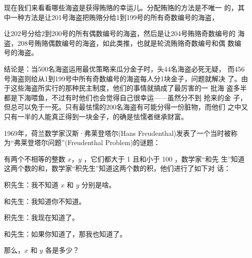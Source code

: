 现在我们来看看哪些海盗是获得贿赂的幸运儿。分配贿赂的方法是不唯一 的，其
中一种方法是让201号海盗把贿赂分给1到199号的所有奇数编号的海盗，
  
让202号分给2到200号的所有偶数编号的海盗，然后是让204号贿赂奇数编号的 海
盗，208号贿赂偶数编号的海盗，如此类推，也就是轮流贿赂奇数编号和偶 数编
号的海盗。
    
结论是：当500名海盗运用最优策略来瓜分金子时，头44名海盗必死无疑，
而456号海盗则给从1到199号中所有奇数编号的海盗每人分1块金子，问题就解决
了。由于这些海盗所实行的那种民主制度，他们的事情就搞成了最厉害的一 批海
盗多半都是下海喂鱼，不过有时他们也会觉得自己很幸运——虽然分不到 抢来的金
子，但总可以免于一死。只有最怯懦的200名海盗有可能分得一份脏物，而他们
之中又只有一半的人能真正得到一块金子，的确是怯懦者继承财富。

\begin{example}
  1969年，荷兰数学家汉斯·弗莱登塔尔(Hans Freudenthal)发表了一个当时被称为“弗莱登塔尔问题”(Freudenthal Problem)的谜题：

  有两个不相等的整数 $x$，$y$ ，它们都大于 1 且和小于 100 ，数学家“和先
  生”知道这两个数的和，数学家“积先生”知道这两个数的积，他们进行了如下对
  话：

  积先生：我不知道 $x$ 和 $y$ 分别是啥。

  和先生：我知道你不知道。

  积先生：我现在知道了。

  和先生：如果你知道了，那我也知道了。

  那么，$x$ 和 $y$ 各是多少？
\end{example}


